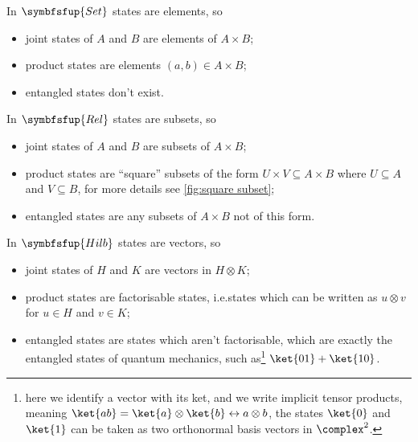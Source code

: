 \documentclass[fleqn]{NotesClass}
\makeatletter
\newcommand{\c@egory}[1]{\symbfsfup{#1}}
\newcommand{\Set}{\c@egory{Set}}
\newcommand{\Rel}{\c@egory{Rel}}
\newcommand{\Hilb}{\c@egory{Hilb}}
\makeatother
\begin{document}
    \begin{exm}{}{}
        In \(\Set\) states are elements, so
        \begin{itemize}
            \item joint states of \(A\) and \(B\) are elements of \(A \times B\);
            \item product states are elements \((a, b) \in A \times B\);
            \item entangled states don't exist.
        \end{itemize}
        In \(\Rel\) states are subsets, so
        \begin{itemize}
            \item joint states of \(A\) and \(B\) are subsets of \(A \times B\);
            \item product states are \enquote{square} subsets of the form \(U \times V \subseteq A \times B\) where \(U \subseteq A\) and \(V \subseteq B\), for more details see \cref{fig:square subset};
            \item entangled states are any subsets of \(A \times B\) not of this form.
        \end{itemize}
        In \(\Hilb\) states are vectors, so
        \begin{itemize}
            \item joint states of \(H\) and \(K\) are vectors in \(H \otimes K\);
            \item product states are factorisable states, i.e.\@ states which can be written as \(u \otimes v\) for \(u \in H\) and \(v \in K\);
            \item entangled states are states which aren't factorisable, which are exactly the entangled states of quantum mechanics, such as\footnote{here we identify a vector with its ket, and we write implicit tensor products, meaning \(\ket{ab} = \ket{a} \otimes \ket{b} \leftrightarrow a \otimes b\), the states \(\ket{0}\) and \(\ket{1}\) can be taken as two orthonormal basis vectors in \(\complex^2\).} \(\ket{01} + \ket{10}\).
        \end{itemize}
    \end{exm}
    
\end{document}
